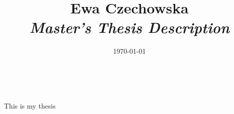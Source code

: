 \documentclass[12pt]{article}
\title{
{\small Ewa Czechowska } \\
\bf\textit{ Master’s Thesis Description } \\
\vspace{4cm}}
\date{\today}
\begin{document}
\maketitle
~\vspace{8cm}
\newpage
\thispagestyle{empty}

This is my thesis
\end{document}

